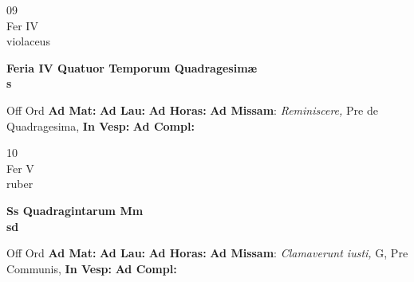 \documentclass[10pt, openany]{book}
\begin{document}
        \begin{center}
            \begin{minipage}{3.5in}
                \vspace{2em}
                \begin{minipage}{0.5in}
                    {\Huge 09} \\
                    {\normalsize Fer IV} \\
                    {\normalsize violaceus}
                \end{minipage}
                \begin{minipage}{3.0in}
                    \textbf{ \large Feria IV Quatuor Temporum Quadragesimæ \\
                    \textnormal{\normalsize s}} \\ 
                \end{minipage}
                \begin{justify}Off Ord
                    \textbf{Ad Mat: }
                    \textbf{Ad Lau: }
                    \textbf{Ad Horas: }\textbf{Ad Missam}: \textit{Reminiscere,} Pre de Quadragesima,  
                    \textbf{In Vesp: }
                    \textbf{Ad Compl: }
                \end{justify}
            \end{minipage}
        \end{center}
    
        \begin{center}
            \begin{minipage}{3.5in}
                \vspace{2em}
                \begin{minipage}{0.5in}
                    {\Huge 10} \\
                    {\normalsize Fer V} \\
                    {\normalsize ruber}
                \end{minipage}
                \begin{minipage}{3.0in}
                    \textbf{ \large Ss Quadragintarum Mm \\
                    \textnormal{\normalsize sd}} \\ 
                \end{minipage}
                \begin{justify}Off Ord
                    \textbf{Ad Mat: }
                    \textbf{Ad Lau: }
                    \textbf{Ad Horas: }\textbf{Ad Missam}: \textit{Clamaverunt iusti,} G, Pre Communis,  
                    \textbf{In Vesp: }
                    \textbf{Ad Compl: }
                \end{justify}
            \end{minipage}
        \end{center}
    
\end{document}

